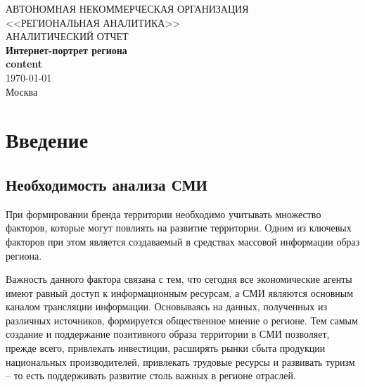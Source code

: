 \documentclass[a4paper,14pt]{extarticle}
\begin{document}
\begin{titlepage}
\begin{center}
{\normalsize АВТОНОМНАЯ НЕКОММЕРЧЕСКАЯ ОРГАНИЗАЦИЯ} \\ 
{\normalsize <<РЕГИОНАЛЬНАЯ АНАЛИТИКА>>} \\
\vspace{\baselineskip}
\vspace{\baselineskip}
\vspace{\baselineskip}
\vspace{\baselineskip}
\vspace{\baselineskip}
\vspace{\baselineskip}
\vspace{\baselineskip}
\vspace{\baselineskip}
\vspace{\baselineskip}
{\LARGE АНАЛИТИЧЕСКИЙ ОТЧЕТ} \\
\vspace{10mm}
{\huge \textbf{ Интернет-портрет региона \\ {{content}} } } \\
\vspace{\baselineskip}
\vspace{80mm}
\today \\
{Москва} 
\end{center}
\end{titlepage}
\newpage
\tableofcontents 
\newpage
\section{Введение}
\subsection{Необходимость анализа СМИ}
При формировании бренда территории необходимо учитывать множество факторов, которые могут повлиять на развитие территории. Одним из ключевых факторов при этом является создаваемый в средствах массовой информации образ региона. 

Важность данного фактора связана с тем, что сегодня все экономические агенты имеют равный доступ к информационным ресурсам, а СМИ являются основным каналом трансляции информации. Основываясь на данных, полученных из различных источников, формируется общественное мнение о регионе. Тем самым создание и поддержание позитивного образа территории в СМИ позволяет, прежде всего, привлекать инвестиции, расширять рынки сбыта продукции национальных производителей, привлекать трудовые ресурсы и развивать туризм – то есть поддерживать развитие столь важных в регионе отраслей.
\end{document}
